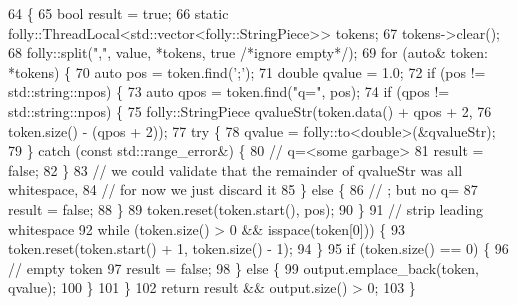 \begin{DoxyCode}
64                                                                          \{
65   \textcolor{keywordtype}{bool} result = \textcolor{keyword}{true};
66   \textcolor{keyword}{static} folly::ThreadLocal<std::vector<folly::StringPiece>> tokens;
67   tokens->clear();
68   folly::split(\textcolor{stringliteral}{","}, value, *tokens, \textcolor{keyword}{true} \textcolor{comment}{/*ignore empty*/});
69   \textcolor{keywordflow}{for} (\textcolor{keyword}{auto}& token: *tokens) \{
70     \textcolor{keyword}{auto} pos = token.find(\textcolor{charliteral}{';'});
71     \textcolor{keywordtype}{double} qvalue = 1.0;
72     \textcolor{keywordflow}{if} (pos != std::string::npos) \{
73       \textcolor{keyword}{auto} qpos = token.find(\textcolor{stringliteral}{"q="}, pos);
74       \textcolor{keywordflow}{if} (qpos != std::string::npos) \{
75         folly::StringPiece qvalueStr(token.data() + qpos + 2,
76                                      token.size() - (qpos + 2));
77         \textcolor{keywordflow}{try} \{
78           qvalue = folly::to<double>(&qvalueStr);
79         \} \textcolor{keywordflow}{catch} (\textcolor{keyword}{const} std::range\_error&) \{
80           \textcolor{comment}{// q=<some garbage>}
81           result = \textcolor{keyword}{false};
82         \}
83         \textcolor{comment}{// we could validate that the remainder of qvalueStr was all whitespace,}
84         \textcolor{comment}{// for now we just discard it}
85       \} \textcolor{keywordflow}{else} \{
86         \textcolor{comment}{// ; but no q=}
87         result = \textcolor{keyword}{false};
88       \}
89       token.reset(token.start(), pos);
90     \}
91     \textcolor{comment}{// strip leading whitespace}
92     \textcolor{keywordflow}{while} (token.size() > 0 && isspace(token[0])) \{
93       token.reset(token.start() + 1, token.size() - 1);
94     \}
95     \textcolor{keywordflow}{if} (token.size() == 0) \{
96       \textcolor{comment}{// empty token}
97       result = \textcolor{keyword}{false};
98     \} \textcolor{keywordflow}{else} \{
99       output.emplace\_back(token, qvalue);
100     \}
101   \}
102   \textcolor{keywordflow}{return} result && output.size() > 0;
103 \}
\end{DoxyCode}
